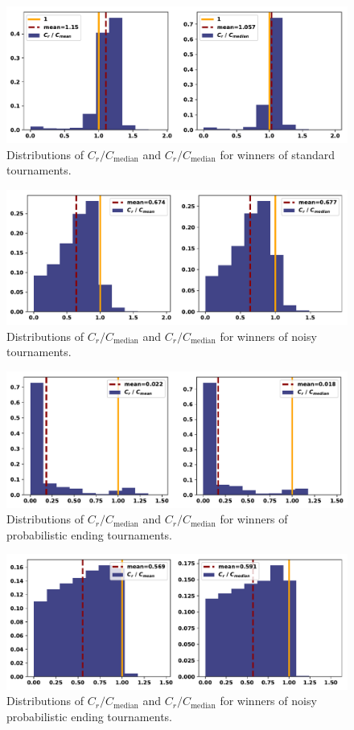 \documentclass{article}
\begin{document}
\begin{figure}[!htbp]
    \centering
    \includegraphics[width=.5\textwidth]{../images/compared_to_mean_median_standard.pdf}
    \caption{Distributions of \(C_r / C_{\text{median}}\)
    and \(C_r / C_{\text{median}}\) for winners of standard tournaments.}\label{fig:mean_median_std}
\end{figure}

\begin{figure}[!htbp]
    \centering
    \includegraphics[width=.5\textwidth]{../images/compared_to_mean_median_noisy.pdf}
    \caption{Distributions of \(C_r / C_{\text{median}}\)
    and \(C_r / C_{\text{median}}\) for winners of noisy tournaments.}\label{fig:mean_median_noisy}
\end{figure}

\begin{figure}[!htbp]
    \centering
    \includegraphics[width=.5\textwidth]{../images/compared_to_mean_median_probend.pdf}
    \caption{Distributions of \(C_r / C_{\text{median}}\)
    and \(C_r / C_{\text{median}}\) for winners of probabilistic ending tournaments.}\label{fig:mean_median_probend}
\end{figure}

\begin{figure}[!htbp]
    \centering
    \includegraphics[width=.5\textwidth]{../images/compared_to_mean_median_probend_noisy.pdf}
    \caption{Distributions of \(C_r / C_{\text{median}}\)
    and \(C_r / C_{\text{median}}\) for winners of noisy probabilistic ending tournaments.}\label{fig:mean_median_probend_noisy}
\end{figure}
\end{document}
